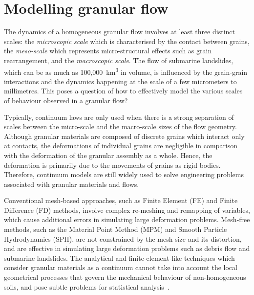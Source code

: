 \section{Modelling granular flow}

The dynamics of a homogeneous granular flow involves at least three distinct 
scales: the \textit{microscopic scale} which is characterised by the contact 
between grains, the \textit{meso-scale} which represents micro-structural 
effects such as grain rearrangement, and the \textit{macroscopic scale}. The 
flow of submarine landslides, which can be as much as 100,000~\si{\km\cubed} 
in volume, is 
influenced by the grain-grain interactions and the dynamics happening at the 
scale of a few micrometers to millimetres. This poses a question of how to 
effectively model the various scales of behaviour observed in a granular 
flow?

Typically, continuum laws are only used when there is a strong separation of 
scales between the micro-scale and the macro-scale sizes of the flow geometry. 
Although granular materials are composed of discrete grains which interact only 
at contacts, the deformations of individual grains are negligible in comparison 
with the deformation of the granular assembly as a whole. Hence, the 
deformation is primarily due to the movements of grains as rigid bodies. 
Therefore, continuum models are still widely used to solve engineering problems 
associated with granular materials and flows. 

Conventional mesh-based approaches, such as Finite Element (FE) and Finite 
Difference (FD) methods, involve complex re-meshing and remapping of variables, 
which cause additional errors in simulating large deformation problems. 
Mesh-free methods, such as the Material Point Method (MPM) and Smooth Particle 
Hydrodynamics (SPH), are not constrained by the mesh size and its distortion, 
and are effective in simulating large deformation problems such as debris 
flow and submarine landslides. The analytical and finite-element-like 
techniques which consider granular materials as a continuum cannot take into 
account the local geometrical processes that govern the mechanical behaviour of 
non-homogeneous soils, and pose subtle problems for statistical 
analysis~\citep{Mehta1994}. 

